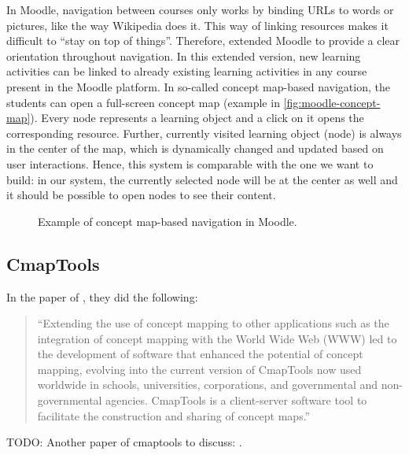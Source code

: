 In Moodle, navigation between courses only works by binding URLs to words or pictures, like the way Wikipedia does it. This way of linking resources makes it difficult to  ``stay on top of things''. Therefore, \cite{scherl2012moodle} extended Moodle to provide a clear orientation throughout navigation. In this extended version, new learning activities can be linked to already existing learning activities in any course present in the Moodle platform. In so-called concept map-based navigation, the students can open a full-screen concept map (example in \autoref{fig:moodle-concept-map}). Every node represents a learning object and a click on it opens the corresponding resource. Further, currently visited learning object (node) is always in the center of the map, which is dynamically changed and updated based on user interactions. Hence, this system is comparable with the one we want to build: in our system, the currently selected node will be at the center as well and it should be possible to open nodes to see their content.

\begin{figure}[H]
	\centering
	\caption{Example of concept map-based navigation in Moodle.}
	\label{fig:moodle-concept-map}
\end{figure}


\subsection{CmapTools}
In the paper of \cite{novak2006conceptmapping}, they did the following:
\begin{quote}
	``Extending the use of concept mapping to other applications such as the integration of concept mapping with the World Wide Web (WWW) led to the development of software that enhanced the potential of concept mapping, evolving into the current version of CmapTools now used worldwide in schools, universities, corporations, and governmental and non-governmental agencies. CmapTools is a client-server software tool to facilitate the construction and sharing of concept maps.''
\end{quote}

TODO: Another paper of cmaptools to discuss: \citep{canas2004conceptmapping}.\\







